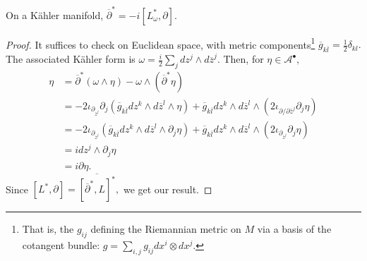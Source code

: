 \begin{lemma}\label{lemma:Kahleridentities}
    On a K\"ahler manifold, $\overline \partial ^* = -i[L_\omega^*, \partial].$
\end{lemma}
\begin{proof}
    It suffices to check on Euclidean space, with metric components\footnote{That is, the $g_{ij}$ defining the Riemannian metric on $M$ via a basis of the cotangent bundle: $g = \sum_{i,j} g_{ij} dx^i \otimes dx^j.$} $\overline{g}_{k\overline l} = \frac{1}{2}\delta_{kl}.$ The associated K\"ahler form is $\omega = \frac{i}{2}\sum_jdz^j \wedge d\overline z^j.$ Then, for $\eta \in \mathcal{A}^\bullet,$
    \begin{align*}
        [\overline{\partial}^{*},L]\eta
        &= \overline{\partial}^{*}(\omega\wedge\eta)-\omega\wedge(\overline{\partial}^{*}\eta) \\
        &= -2 \iota_{\partial_{ \bar z^j}} \partial_{j}\left( \overline{g}_{k \overline{l}} dz^{k}\wedge d \overline{z}^{ l}\wedge\eta\right)
        + \overline{g}_{k \overline{l}} dz^{k}\wedge d \overline{z}^{ l}\wedge\left(2 \iota_{\partial/\partial \bar z^j} \partial_{j}\eta\right) \\
        &= -2 \iota_{\partial_{ \bar z^j}} \left( \overline{g}_{k \overline{l}} dz^{k}\wedge d \overline{z}^{ l}\wedge\partial_{j}\eta\right)
        + \overline{g}_{k \overline{l}} dz^{k}\wedge d \overline{z}^{ l}\wedge\left(2 \iota_{\partial_{ \bar z^j}}\partial_{j}\eta\right) \\
        &= i dz^{j}\wedge\partial_{j}\eta\\
        &= i \partial\eta.
    \end{align*}
Since $[L^*, \partial] = \overline{[ \overline{\partial}^{*},L]^*},$ we get our result.
\end{proof}

